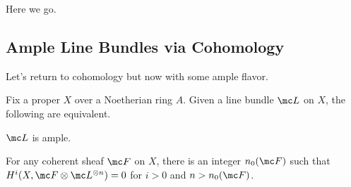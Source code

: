 \documentclass[../notes.tex]{subfiles}
\begin{document}
Here we go.

\subsection{Ample Line Bundles via Cohomology}
Let's return to cohomology but now with some ample flavor.
\begin{proposition} \label{prop:ample-kills-cohomology}
	Fix a proper $X$ over a Noetherian ring $A$. Given a line bundle $\mc L$ on $X$, the following are equivalent.
	\begin{listroman}
		\item $\mc L$ is ample.
		\item For any coherent sheaf $\mc F$ on $X$, there is an integer $n_0(\mc F)$ such that $H^i(X,\mc F\otimes\mc L^{\otimes n})=0$ for $i>0$ and $n>n_0(\mc F)$.
	\end{listroman}
\end{proposition}
\end{document}
